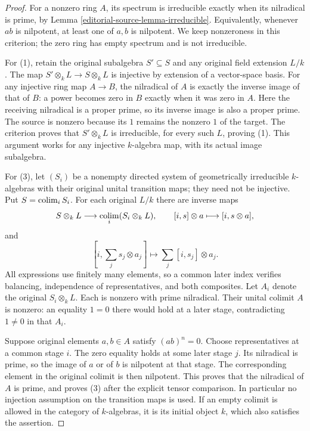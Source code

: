 \begin{proof}
For a nonzero ring $A$, its spectrum
is irreducible exactly when its
nilradical is prime, by Lemma
\ref{editorial-source-lemma-irreducible}. Equivalently,
whenever $ab$ is nilpotent, at
least one of $a,b$ is nilpotent.
We keep nonzeroness in this
criterion; the zero ring has
empty spectrum and is not
irreducible.

For (1), retain the original
subalgebra $S'\subseteq S$ and
any original field extension
$L/k$. The map
$S'\otimes_k L\to S\otimes_k L$
is injective by extension of
a vector-space basis. For any
injective ring map $A\to B$,
the nilradical of $A$ is exactly
the inverse image of that of
$B$: a power becomes zero in
$B$ exactly when it was zero
in $A$. Here the receiving
nilradical is a proper prime,
so its inverse image is also
a proper prime. The source is
nonzero because its $1$ remains
the nonzero $1$ of the target.
The criterion proves that
$S'\otimes_k L$ is irreducible,
for every such $L$, proving (1).
This argument works for any
injective $k$-algebra map, with
its actual image subalgebra.

For (3), let $(S_i)$ be a
nonempty directed system of
geometrically irreducible
$k$-algebras with their original
unital transition maps; they
need not be injective. Put
$S=\mathop{\rm colim}_i S_i$.
For each original $L/k$ there
are inverse maps
$$
S\otimes_k L\longrightarrow
\mathop{\rm colim}_i(S_i\otimes_k L),
\qquad [i,s]\otimes a\longmapsto[i,s\otimes a],
$$
and
$$
[i,\sum_j s_j\otimes a_j]
\longmapsto\sum_j[i,s_j]\otimes a_j.
$$
All expressions use finitely
many elements, so a common
later index verifies balancing,
independence of representatives,
and both composites. Let $A_i$
denote the original $S_i\otimes_k L$.
Each is nonzero with prime
nilradical. Their unital colimit
$A$ is nonzero: an equality
$1=0$ there would hold at a
later stage, contradicting
$1\neq0$ in that $A_i$.

Suppose original elements
$a,b\in A$ satisfy $(ab)^n=0$.
Choose representatives at a
common stage $i$. The zero
equality holds at some later
stage $j$. Its nilradical is
prime, so the image of $a$
or of $b$ is nilpotent at
that stage. The corresponding
element in the original
colimit is then nilpotent.
This proves that the nilradical
of $A$ is prime, and proves
(3) after the explicit tensor
comparison. In particular no
injection assumption on the
transition maps is used.
If an empty colimit is allowed
in the category of $k$-algebras,
it is its initial object $k$,
which also satisfies the
assertion.


\end{proof}
